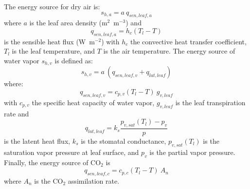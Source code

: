 The energy source for dry air is:
\begin{equation}
s_{h,a} = a~ q_{sen,leaf,a}
\end{equation}
where $a$ is the leaf area density (m$^{2}$~m$^{-3}$) and
\begin{equation}
q_{sen,leaf,a} = h_c \left(T_l - T\right)
\end{equation}
is the sensible heat flux (W~m$^{-2}$) with $h_c$ the convective heat transfer coefficient, $T_l$ is the leaf temperature, and $T$ is the air temperature. The energy source of water vapor $s_{h,v}$ is defined as:
\begin{equation}
s_{h,v} = a ~ \left( q_{sen,leaf,v}  + q_{lat,leaf} \right)
\end{equation}
where:
\begin{equation}
q_{sen,leaf,v} = c_{p,v} \left(T_l - T\right) ~ g_{v,leaf}
\end{equation}
with $c_{p,v}$ the specific heat capacity of water vapor, $g_{v,leaf}$ is the leaf transpiration rate and
\begin{equation}
q_{lat,leaf} = k_s \frac{p_{v,sat}(T_l) - p_v}{p}
\end{equation}
is the latent heat flux, $k_s$ is the stomatal conductance, $p_{v,sat}(T_l)$ is the saturation vapor pressure at leaf surface, and $p_v$ is the partial vapor pressure. Finally, the energy source of CO$_2$ is 
\begin{equation}
q_{sen,leaf,c} = c_{p,c} \left(T_l - T\right)~A_n
\end{equation}
where $A_n$ is the CO$_2$ assimilation rate.

